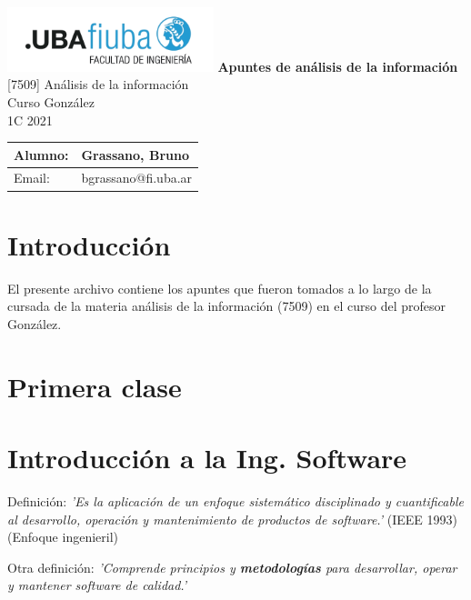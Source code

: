 \documentclass[titlepage,a4paper]{article}
\begin{document}
\begin{titlepage} %
	\hfill\includegraphics[width=6cm]{logofiuba.jpg}
    \centering
    \vfill
    \Huge \textbf{Apuntes de análisis de la información}
    \vskip2cm
    \Large [7509] Análisis de la información\\
    Curso González \\
    1C 2021 
    \vfill
    \begin{tabular}{ | l | l | }
      \hline
      Alumno: & Grassano, Bruno \\ \hline
      Email: & bgrassano@fi.uba.ar \\ \hline
  	\end{tabular}
    \vfill
    \vfill
\end{titlepage}

\tableofcontents %

\newpage

\section{Introducción}\label{sec:intro}
El presente archivo contiene los apuntes que fueron tomados a lo largo de la cursada de la materia análisis de la información (7509) en el curso del profesor González.



\section*{Primera clase}
\section{Introducción a la Ing. Software}
Definición: \textit{'Es la aplicación de un enfoque sistemático disciplinado y cuantificable al desarrollo, operación y mantenimiento de productos de software.'} (IEEE 1993) (Enfoque ingenieril)

\medskip

Otra definición: \textit{'Comprende principios y \textbf{metodologías} para desarrollar, operar y mantener software de calidad.'}
\end{document}
